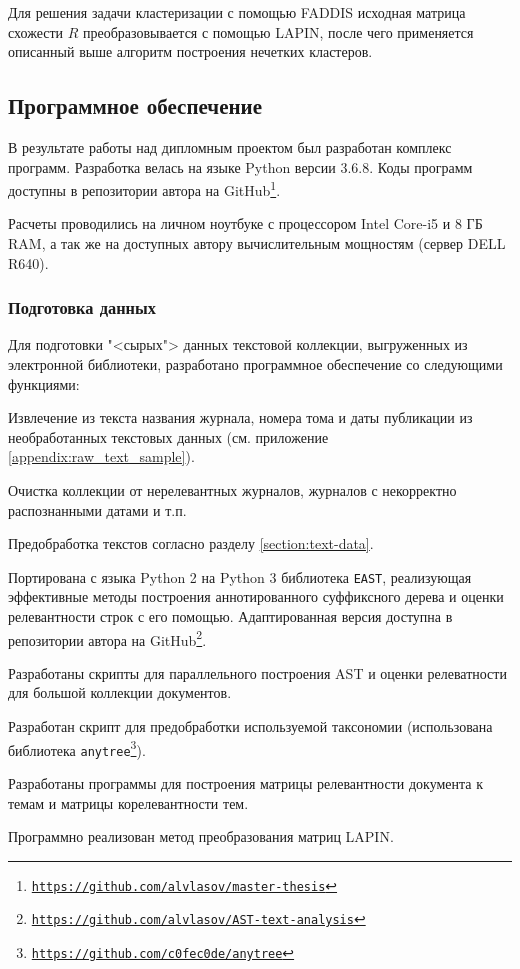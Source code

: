 \documentclass[12pt]{article}
\newenvironment{itemize*}%
{\begin{itemize}%
	\setlength{\itemsep}{0pt}%
	\setlength{\parskip}{0pt}}%
{\end{itemize}}
\newenvironment{enumerate*}%
{\begin{enumerate}%
	\setlength{\itemsep}{0pt}%
	\setlength{\parskip}{0pt}}%
{\end{enumerate}}
\newcommand{\hrefl}[1] {\texttt{\href{#1}{#1}}}
\let\oldsubsection\subsection
\renewcommand{\subsection}{\clearpage\oldsubsection}
\begin{document}
Для решения задачи кластеризации с помощью FADDIS исходная матрица схожести $R$ преобразовывается с помощью LAPIN, после чего применяется описанный выше алгоритм построения нечетких кластеров.

\subsection{Программное обеспечение}

В результате работы над дипломным проектом был разработан комплекс программ. Разработка велась на языке Python версии 3.6.8. Коды программ доступны в репозитории автора на GitHub\footnote{\hrefl{https://github.com/alvlasov/master-thesis}}.

Расчеты проводились на личном ноутбуке с процессором Intel Core-i5 и 8 ГБ RAM, а так же на доступных автору вычислительным мощностям (сервер DELL R640).

\subsubsection{Подготовка данных}

\begin{itemize*}
	
	\item Для подготовки "<сырых"> данных текстовой коллекции, выгруженных из электронной библиотеки, разработано программное обеспечение со следующими функциями:
	\texttt{}
	\begin{enumerate*}
		\item Извлечение из текста названия журнала, номера тома и даты публикации из необработанных текстовых данных (см. приложение \ref{appendix:raw_text_sample}).  
		\item Очистка коллекции от нерелевантных журналов, журналов с некорректно распознанными датами и т.п.
		\item Предобработка текстов согласно разделу \ref{section:text-data}.
	\end{enumerate*}
	
	
	\item Портирована с языка Python 2 на Python 3 библиотека \texttt{EAST}, реализующая эффективные методы построения аннотированного суффиксного дерева и оценки релевантности строк с его помощью. Адаптированная версия доступна в репозитории автора на GitHub\footnote{\hrefl{https://github.com/alvlasov/AST-text-analysis}}.
	\item Разработаны скрипты для параллельного построения AST и оценки релеватности для большой коллекции документов.
	\item Разработан скрипт для предобработки используемой таксономии (использована библиотека \texttt{anytree}\footnote{\hrefl{https://github.com/c0fec0de/anytree}}).
	\item Разработаны программы для построения матрицы релевантности документа к темам и матрицы корелевантности тем.
	\item Программно реализован метод преобразования матриц LAPIN.
\end{itemize*}
\end{document}

